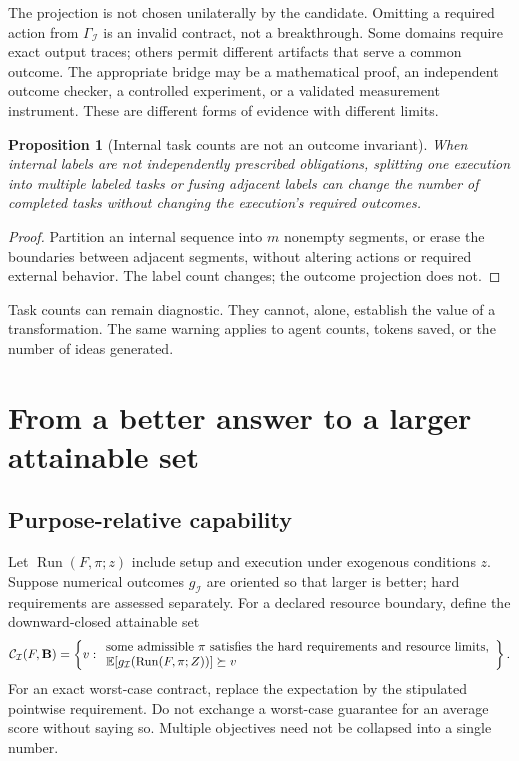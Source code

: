 \documentclass[11pt,letterpaper]{article}
\newcommand{\I}{\mathcal I}\newcommand{\A}{\mathcal A}
\newcommand{\E}{\mathbb E}\newcommand{\Prob}{\mathbb P}
\newtheorem{proposition}{Proposition}[section]
\theoremstyle{remark}\newtheorem{remark}{Remark}[section]
\begin{document}
The projection is not chosen unilaterally by the candidate. Omitting a required action from $\Gamma_{\I}$ is an invalid contract, not a breakthrough. Some domains require exact output traces; others permit different artifacts that serve a common outcome. The appropriate bridge may be a mathematical proof, an independent outcome checker, a controlled experiment, or a validated measurement instrument. These are different forms of evidence with different limits.

\begin{proposition}[Internal task counts are not an outcome invariant]
When internal labels are not independently prescribed obligations, splitting one execution into multiple labeled tasks or fusing adjacent labels can change the number of completed tasks without changing the execution's required outcomes.
\end{proposition}
\begin{proof}
Partition an internal sequence into $m$ nonempty segments, or erase the boundaries between adjacent segments, without altering actions or required external behavior. The label count changes; the outcome projection does not.
\end{proof}
Task counts can remain diagnostic. They cannot, alone, establish the value of a transformation. The same warning applies to agent counts, tokens saved, or the number of ideas generated.

\section{From a better answer to a larger attainable set}\label{sec:frontier}
\subsection{Purpose-relative capability}
Let $\operatorname{Run}(F,\pi;z)$ include setup and execution under exogenous conditions $z$. Suppose numerical outcomes $g_{\I}$ are oriented so that larger is better; hard requirements are assessed separately. For a declared resource boundary, define the downward-closed attainable set
\begin{equation}\label{eq:attainable}
\Cset_{\I}(F,\mathbf B)=\left\{v:\begin{array}{l}
\text{some admissible }\pi\text{ satisfies the hard requirements and resource limits,}\\
\E[g_{\I}(\operatorname{Run}(F,\pi;Z))]\succeq v
\end{array}\right\}.
\end{equation}
For an exact worst-case contract, replace the expectation by the stipulated pointwise requirement. Do not exchange a worst-case guarantee for an average score without saying so. Multiple objectives need not be collapsed into a single number.
\end{document}
